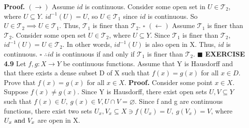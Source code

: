 \documentclass[12pt]{article}
\begin{document}
  \newline
  \newline
  \textbf{Proof.}
  \newline
  \((\rightarrow)\) Assume \(id\) is continuous.
  \newline
  Consider some open set in \(U \in \mathcal{T}_2\), where \(U \subseteq Y\).
  \newline
  \(id^{-1}(U) = U\), so \(U \in \mathcal{T}_1\) since \(id\) is continuous.
  \newline
  So \(U \in \mathcal{T}_2 \implies U \in \mathcal{T}_1\).
  \newline
  Thus, \(\mathcal{T}_1\) is finer than \(\mathcal{T}_2\).
  \newline \(\square\) \newline
  \((\leftarrow)\) Assume \(\mathcal{T}_1\) is finer than \(\mathcal{T}_2\).
  \newline
  Consider some open set \(U \in \mathcal{T}_2\), where \(U \subseteq Y\).
  \newline
  Since \(\mathcal{T}_1\) is finer than \(\mathcal{T}_2\), \(id^{-1}(U) = U \in \mathcal{T}_2\).
  \newline
  In other words, \(id^{-1}(U)\) is also open in X.
  \newline
  Thus, \(id\) is continuous.
  \newline \(\square\) \newline
  \(\therefore id\) is continuous if and only if \(\mathcal{T}_1\) is finer than \(\mathcal{T}_2\).
  \newline \(\blacksquare\)
  \newpage
  \noindent
  \textbf{EXERCISE 4.9}
  \newline
  Let \(f,g:X\rightarrow Y\) be continuous functions. Assume that Y is Hausdorff and that there exists a dense subset D of X such that \(f(x) = g(x)\) for all \(x \in D\). Prove that \(f(x) = g(x)\) for all \(x \in X\).
  \newline \newline
  \textbf{Proof.}
  \newline
  Consider some point \(x \in X\).
  \newline
  Suppose \(f(x) \neq g(x)\).
  \newline
  Since Y is Hausdorff, there exist open sets \(U,V \subseteq Y\) such that \(f(x) \in U,\ g(x) \in V, U \cap V = \varnothing\).
  \newline \newline
  Since f and g are continuous functions, there exist two sets \(U_x,V_x \subseteq X \ni f(U_x) = U,\ g(V_x) = V\), where \(U_x \textup{ and } V_x\) are open in X.
\end{document}
